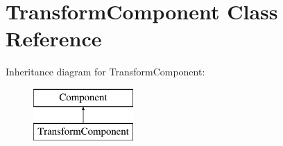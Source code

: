 \hypertarget{class_transform_component}{}\section{Transform\+Component Class Reference}
\label{class_transform_component}
Inheritance diagram for Transform\+Component\+:\begin{figure}[H]
\begin{center}
\leavevmode
\includegraphics[height=2.000000cm]{class_transform_component}
\end{center}
\end{figure}
